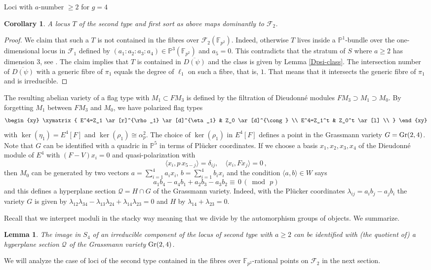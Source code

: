\documentclass[11pt]{amsart}
\numberwithin{equation}{section}
\newcommand{\FF}{\mathbb F}
\newcommand{\PP}{\mathbb P}
\newtheorem{lemma}[theorem]{Lemma}
\newtheorem{corollary}[theorem]{Corollary}
\theoremstyle{definition}
\theoremstyle{remark}
\begin{document}
\begin{section}{Loci with $a$-number $\geq 2$ for $g=4$}
\begin{corollary} A locus $T$ of the second type and first sort as above 
maps dominantly to $\mathcal{F}_2$.
\end{corollary}
\begin{proof}
We claim that such a $T$ is not contained in the fibres over $\mathcal{F}_2({\FF}_{p^2})$.
Indeed, otherwise $T$ lives inside a ${\PP}^1$-bundle over the one-dimensional
locus in $\mathcal{F}_1$ defined by $(a_1:a_2:a_3:a_4)\in {\PP}^3({\FF}_{p^2})$
and $a_5=0$. This contradicts that the stratum of $S$ where $a\geq 2$ has dimension $3$,
see \cite[9.9]{L-O}. The claim implies 
that $T$ is contained in
$\overline{D(\psi)}$ and the class is given by Lemma \ref{Dpsi-class}.
The intersection number of $\overline{D(\psi)}$ with a generic fibre of
$\pi_1$ equals the degree of $\ell_1$ on such a fibre, that is, $1$.
That means that it intersects the generic fibre
of $\pi_1$ and is irreducible.
\end{proof}
The resulting abelian variety of a flag type with $M_1 \subset FM_3$ 
is defined by the filtration of Dieudonn\'e
modules $FM_3 \supset M_1 \supset M_0$. By forgetting $M_1$ between
$FM_3$ and $M_0$,  we have polarized flag types
$$
\begin{xy}
\xymatrix{
E^4=Z_1 \ar[r]^{\rho_1} \ar[d]^{\eta_1}  & Z_0 \ar[d]^{\cong} \\
E^4=Z_1^t & Z_0^t \ar[l] \\
}
\end{xy}
$$
with $\ker(\eta_1)=E^4[F]$ and $\ker(\rho_1)\cong \alpha_p^2$. The choice of
$\ker(\rho_1)$ in $E^4[F]$ defines a point in the Grassmann variety $G={\rm Gr}(2,4)$.
Note that $G$ can be identified with a quadric in ${\PP}^5$ in terms of Pl\"ucker coordinates.
If we choose a basis $x_1,x_2,x_3,x_4$ of the Dieudonn\'e module of $E^4$
with $(F-V)x_i=0$ and quasi-polarization with
$$
\langle x_i, p\, x_{5-j}\rangle = \delta_{ij}, \quad \langle x_i,Fx_j\rangle=0 \, ,
$$
then $M_0$ can be generated by two vectors $a=\sum_{i=1}^4 a_ix_i$,
$b=\sum_{i=1}^4 b_i x_i$ and the condition $\langle a,b\rangle \in W$ says
$$
a_1b_4-a_4b_1+a_2b_3-a_3b_2\equiv \, 0 \, (\bmod \, p)
$$
and this defines a hyperplane section $\mathcal{Q}=H \cap G$ of the Grassmann variety.
Indeed, with the Pl\"ucker coordinates $\lambda_{ij}=a_ib_j-a_jb_i$ the variety
$G$ is given by $\lambda_{12}\lambda_{34}-\lambda_{13}\lambda_{24}+\lambda_{14}\lambda_{23}=0$
and $H$ by $\lambda_{14}+\lambda_{23}=0$.

Recall that we interpret moduli in the stacky way meaning that we divide by
the automorphism groups of objects.  We summarize.

\begin{lemma}
The image in $S_4$ 
of an irreducible component of the locus of second type with $a\geq 2$ 
can be identified with (the quotient of) a hyperplane section $\mathcal{Q}$ 
of the Grassmann variety ${\rm Gr}(2,4)$.
\end{lemma}

We will analyze the case of loci of the second type contained in the fibres
over ${\FF}_{p^2}$-rational points on $\mathcal{F}_2$ in the next section.
\end{section}
\end{document}
